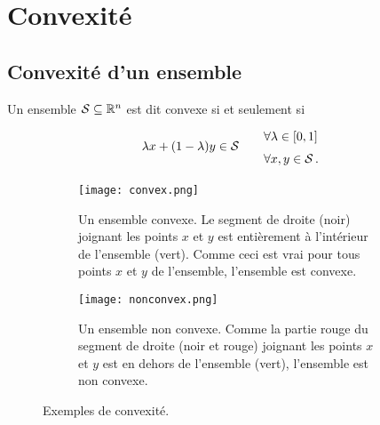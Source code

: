 \section{Convexité}

\subsection{Convexité d'un ensemble}

	\begin{mydef}
		Un ensemble $\mathcal{S} \subseteq \mathbb{R}^n$ est dit convexe
		si et seulement si
		\[
		\renewcommand{\arraystretch}{1.5}
		\begin{tabular}{c@{\qquad}l}
			\multirow{2}{*}{$\lambda x + (1 - \lambda)y \in \mathcal{S}$}
			& $\forall \lambda \in \interval{0}{1}$\\
			& $\forall x,y \in \mathcal{S}$\,.
		\end{tabular}
		\]

		\begin{figure}[H]
		\begin{subfigure}[t]{.45\linewidth}
		\centering
		\texttt{[image: convex.png]}
		\caption{Un ensemble convexe.
		Le segment de droite (noir) joignant les points $x$ et $y$
		est entièrement à l'intérieur de l'ensemble (vert).
		Comme ceci est vrai pour tous points $x$ et $y$ de l'ensemble,
		l'ensemble est convexe.}\label{fig:convex_set}
		\end{subfigure}%
		\hfill
		\begin{subfigure}[t]{.45\linewidth}
		\centering
		\texttt{[image: nonconvex.png]}
		\caption{Un ensemble non convexe.
		Comme la partie rouge du segment de droite (noir et rouge)
		joignant les points $x$ et $y$
		est en dehors de l'ensemble (vert),
		l'ensemble est non convexe.}\label{fig:nonconvex_set}
		\end{subfigure}
		\caption{Exemples de convexité.}\label{fig:convexity}
		\end{figure}
	\end{mydef}

